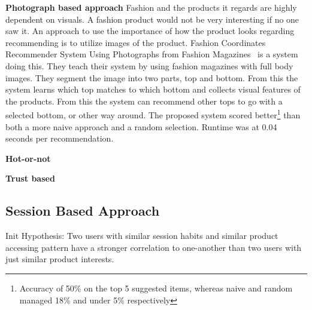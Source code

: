 \textbf{Photograph based approach}
Fashion and the products it regards are highly dependent on visuals.
A fashion product would not be very interesting if no one saw it. %
An approach to use the importance of how the product looks regarding recommending is to utilize images of the product.
Fashion Coordinates Recommender System Using Photographs from Fashion Magazines~\cite{Iwata:2011} is a system doing this.
They teach their system by using fashion magazines with full body images.
They segment the image into two parts, top and bottom.
From this the system learns which top matches to which bottom and collects visual features of the products.
From this the system can recommend other tops to go with a selected bottom, or other way around.
The proposed system scored better\footnote{Accuracy of 50\% on the top 5 suggested items, whereas naive and random managed 18\% and under 5\% respectively} than both a more naive approach and a random selection.
Runtime was at 0.04 seconds per recommendation.


\textbf{Hot-or-not}

\textbf{Trust based}








\subsection{Session Based Approach}
Init Hypothesis:
Two users with similar session habits and similar product accessing pattern
have a stronger correlation to one-another than two users with just similar
product interests.


